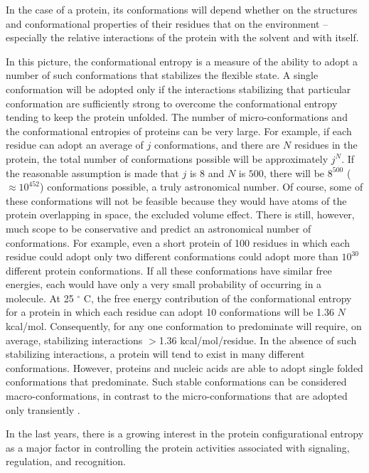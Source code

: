 In the case of a protein, its conformations will depend whether on the structures and conformational properties of their residues that on the environment -- especially the relative interactions of the protein with the solvent and with itself.

In this picture, the conformational entropy is a measure of the ability to adopt a number of such conformations that stabilizes the flexible state. A single conformation will be adopted only if the interactions stabilizing that particular conformation are sufficiently strong to overcome the conformational entropy tending to keep the protein unfolded. The number of micro-conformations and the conformational entropies of proteins can be very large. For example, if each residue can adopt an average of $j$ conformations, and there are $N$ residues in the protein, the total number of conformations possible will be approximately $j^N$. If the reasonable assumption is made that $j$ is $8$ and $N$ is $500$, there will be $8^{500}$ ($\approx 10^{452}$) conformations possible, a truly astronomical number. Of course, some of these conformations will not be feasible because they would have atoms of the protein overlapping in space, the excluded volume effect. There is still, however, much scope to be conservative and predict an astronomical number of conformations. For example, even a short protein of 100 residues in which each residue could adopt only two different conformations could adopt more than $10^{30}$ different protein conformations. If all these conformations have similar free energies, each would have only a very small probability of occurring in a molecule. At 25 %
$^\circ$ C, the free energy contribution of the conformational entropy for a protein in which each residue can adopt 10 conformations will be 1.36 $N$ kcal/mol. Consequently, for any one conformation to predominate will require, on average, stabilizing interactions $>$1.36 kcal/mol/residue. In the absence of such stabilizing interactions, a protein will tend to exist in many different conformations. However, proteins and nucleic acids are able to adopt single folded conformations that predominate. Such stable conformations can be considered macro-conformations, in contrast to the micro-conformations that are adopted only transiently \cite{creighton2010biophysical}.


In the last years, there is a growing interest in the protein configurational entropy as a major factor in controlling the protein activities associated with signaling, regulation, and recognition.

